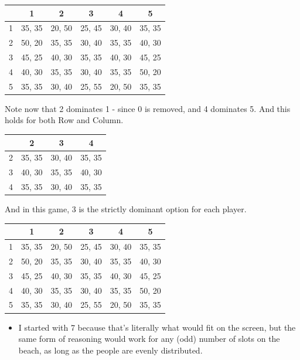 \documentclass[
  14pt,
  letterpaper,
  ignorenonframetext,
  aspectratio=169,
]{beamer}
\providecommand{\tightlist}{%
  \setlength{\itemsep}{0pt}\setlength{\parskip}{0pt}}\usepackage{longtable,booktabs,array}
\let\olditem\item
\renewcommand{\item}{%
\olditem\vspace{6pt}}
\begin{document}
\begin{frame}[plain]{}
\protect\hypertarget{section-6}{}
\begin{table}[!h]
\centering
\begin{tabular}[t]{>{}r|ccccc}
\toprule
 & 1 & 2 & 3 & 4 & 5\\
\midrule
1 & 35, 35 & 20, 50 & 25, 45 & 30, 40 & 35, 35\\
2 & 50, 20 & 35, 35 & 30, 40 & 35, 35 & 40, 30\\
3 & 45, 25 & 40, 30 & 35, 35 & 40, 30 & 45, 25\\
4 & 40, 30 & 35, 35 & 30, 40 & 35, 35 & 50, 20\\
5 & 35, 35 & 30, 40 & 25, 55 & 20, 50 & 35, 35\\
\bottomrule
\end{tabular}
\end{table}

Note now that 2 dominates 1 - since 0 is removed, and 4 dominates 5. And
this holds for both Row and Column.
\end{frame}

\begin{frame}[plain]{}
\protect\hypertarget{section-7}{}
\begin{table}[!h]
\centering
\begin{tabular}[t]{>{}r|ccc}
\toprule
 & 2 & 3 & 4\\
\midrule
2 & 35, 35 & 30, 40 & 35, 35\\
3 & 40, 30 & 35, 35 & 40, 30\\
4 & 35, 35 & 30, 40 & 35, 35\\
\bottomrule
\end{tabular}
\end{table}

And in this game, 3 is the strictly dominant option for each player.
\end{frame}

\begin{frame}[plain]{}
\protect\hypertarget{section-8}{}
\begin{table}[!h]
\centering
\begin{tabular}[t]{>{}r|ccccc}
\toprule
 & 1 & 2 & 3 & 4 & 5\\
\midrule
1 & 35, 35 & 20, 50 & 25, 45 & 30, 40 & 35, 35\\
2 & 50, 20 & 35, 35 & 30, 40 & 35, 35 & 40, 30\\
3 & 45, 25 & 40, 30 & 35, 35 & 40, 30 & 45, 25\\
4 & 40, 30 & 35, 35 & 30, 40 & 35, 35 & 50, 20\\
5 & 35, 35 & 30, 40 & 25, 55 & 20, 50 & 35, 35\\
\bottomrule
\end{tabular}
\end{table}

\begin{itemize}[<+->]
\tightlist
\item
  I started with 7 because that's literally what would fit on the
  screen, but the same form of reasoning would work for any (odd) number
  of slots on the beach, as long as the people are evenly distributed.
\end{itemize}
\end{frame}
\end{document}
